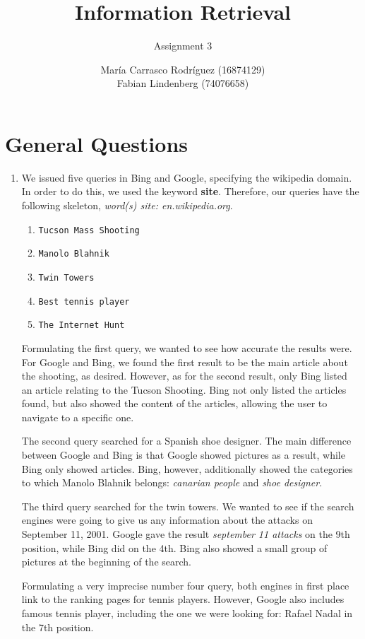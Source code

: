 \documentclass[a4paper,11pt,oneside]{book}
\title{Information Retrieval }
\subtitle{Assignment 3}
\author{ María Carrasco Rodríguez (16874129) \\
		Fabian Lindenberg (74076658)}
\begin{document}
\kostspieligmaketitle


\chapter{General Questions}

\begin{enumerate}\item We issued five queries in Bing and Google, specifying the wikipedia domain. In order to do this, we used the keyword {\bf site}. Therefore, our queries have the following skeleton, {\it word(s) site: en.wikipedia.org}.
		\begin{enumerate}
			\renewcommand{\labelenumii}{\Roman{enumii}}
			\item \texttt{Tucson Mass Shooting}
			\item \texttt{Manolo Blahnik}
			\item \texttt{Twin Towers}
			\item \texttt{Best tennis player}
			\item \texttt{The Internet Hunt}
		\end{enumerate}
	Formulating the first query, we wanted to see how accurate the results were. For Google and Bing, we found the first result to be the main article about the shooting, as desired. However, as for the second result, only Bing listed an article relating to the Tucson Shooting. Bing not only listed the articles found, but also showed the content of the articles, allowing the user to navigate to a specific one.

	The second query searched for a Spanish shoe designer. The main difference between Google and Bing is that Google showed pictures as a result, while Bing only showed articles. Bing, however, additionally showed the categories to which Manolo Blahnik belongs: {\it canarian people} and {\it shoe designer}.

	The third query searched for the twin towers. We wanted to see if the search engines were going to give us any information about the attacks on September 11, 2001. Google gave the result {\it september 11 attacks} on the 9th position, while Bing did on the 4th. Bing also showed a small group of pictures at the beginning of the search.

	Formulating a very imprecise number four query, both engines in first place link to the ranking pages for tennis players. However, Google also includes famous tennis player, including the one we were looking for: Rafael Nadal in the 7th position.
	

\end{enumerate}
\end{document}
